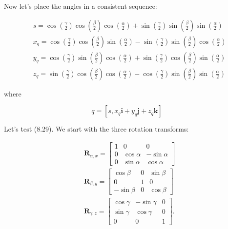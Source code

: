 \documentclass[10pt]{article}
\begin{document}
Now let's place the angles in a consistent sequence:

$$
\begin{aligned}
& s=\cos \left(\frac{\gamma}{2}\right) \cos \left(\frac{\beta}{2}\right) \cos \left(\frac{\alpha}{2}\right)+\sin \left(\frac{\gamma}{2}\right) \sin \left(\frac{\beta}{2}\right) \sin \left(\frac{\alpha}{2}\right) \\
& x_{q}=\cos \left(\frac{\gamma}{2}\right) \cos \left(\frac{\beta}{2}\right) \sin \left(\frac{\alpha}{2}\right)-\sin \left(\frac{\gamma}{2}\right) \sin \left(\frac{\beta}{2}\right) \cos \left(\frac{\alpha}{2}\right) \\
& y_{q}=\cos \left(\frac{\gamma}{2}\right) \sin \left(\frac{\beta}{2}\right) \cos \left(\frac{\alpha}{2}\right)+\sin \left(\frac{\gamma}{2}\right) \cos \left(\frac{\beta}{2}\right) \sin \left(\frac{\alpha}{2}\right) \\
& z_{q}=\sin \left(\frac{\gamma}{2}\right) \cos \left(\frac{\beta}{2}\right) \cos \left(\frac{\alpha}{2}\right)-\cos \left(\frac{\gamma}{2}\right) \sin \left(\frac{\beta}{2}\right) \sin \left(\frac{\alpha}{2}\right)
\end{aligned}
$$

where

$$
q=\left[s, x_{q} \mathbf{i}+y_{q} \mathbf{j}+z_{q} \mathbf{k}\right]
$$

Let's test (8.29). We start with the three rotation transforms:

$$
\begin{aligned}
& \mathbf{R}_{\alpha, x}=\left[\begin{array}{ccc}
1 & 0 & 0 \\
0 & \cos \alpha & -\sin \alpha \\
0 & \sin \alpha & \cos \alpha
\end{array}\right] \\
& \mathbf{R}_{\beta, y}=\left[\begin{array}{ccc}
\cos \beta & 0 & \sin \beta \\
0 & 1 & 0 \\
-\sin \beta & 0 & \cos \beta
\end{array}\right] \\
& \mathbf{R}_{\gamma, z}=\left[\begin{array}{ccc}
\cos \gamma & -\sin \gamma & 0 \\
\sin \gamma & \cos \gamma & 0 \\
0 & 0 & 1
\end{array}\right] .
\end{aligned}
$$
\end{document}
